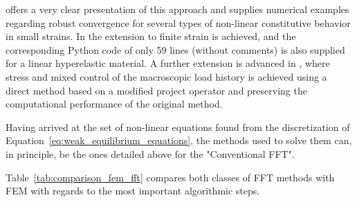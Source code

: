 \cite{zeman_finite_2017} offers a very clear presentation of this approach and supplies numerical examples regarding robust convergence for several types of non-linear constitutive behavior in small strains.
In \cite{de_geus_finite_2017} the extension to finite strain is achieved, and the corresponding Python code of only 59 lines (without comments) is also supplied for a linear hyperelastic material.
A further extension is advanced in \cite{lucarini_algorithm_2019}, where stress and mixed control of the macroscopic load history is achieved using a direct method based on a modified project operator and preserving the computational performance of the original method.

Having arrived at the set of non-linear equations found from the discretization of Equation~\eqref{eq:weak_equilibrium_equations}, the methods used to solve them can, in principle, be the ones detailed above for the "Conventional FFT".

Table~\ref{tab:comparison_fem_fft} compares both classes of FFT methods with FEM with regards to the most important algorithmic steps.

